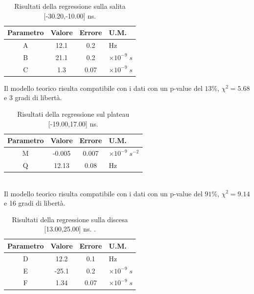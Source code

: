\documentclass[11pt]{article} %
\begin{document}
\begin{table}[!h]
\begin{center}
\begin{tabular}{|c|c|c|l|}
\hline
\multicolumn{1}{|l|}{Parametro} & \multicolumn{1}{l|}{Valore} & \multicolumn{1}{l|}{Errore} & U.M. \\ \hline
A                               & 12.1                       & 0.2                      & Hz     \\ \hline
B                               & 21.1                        & 0.2                           & $\times10^{-9}\;s$    \\ \hline
C                               & 1.3                          & 0.07                          &  $\times10^{-9}\;s$    \\ \hline
\end{tabular}
\end{center}
\caption{Risultati della regressione sulla salita [-30.20,-10.00] ns.}
\end{table}
Il modello teorico risulta compatibile con i dati con un p-value del $13\%$, $\chi ^2=5.68$ e 3 gradi di libertà.
\begin{table}[!h]
\begin{center}
\begin{tabular}{|c|c|c|l|}
\hline
\multicolumn{1}{|l|}{Parametro} & \multicolumn{1}{l|}{Valore} & \multicolumn{1}{l|}{Errore} & U.M. \\ \hline
M                               & -0.005                       & 0.007                 & $\times 10^{-9}\;s^{-2}$     \\ \hline
Q                               & 12.13                      & 0.08                           & Hz    \\ \hline
\end{tabular}
\end{center}
\caption{Risultati della regressione sul plateau  [-19.00,17.00] ns.}
\end{table}
\\Il modello teorico risulta compatibile con i dati con un p-value del $91\%$, $\chi ^2=9.14$ e 16 gradi di libertà.
\begin{table}[!h]
\begin{center}
\begin{tabular}{|c|c|c|l|}
\hline
\multicolumn{1}{|l|}{Parametro} & \multicolumn{1}{l|}{Valore} & \multicolumn{1}{l|}{Errore} & U.M. \\ \hline
D                               & 12.2                       & 0.1                       &    Hz \\ \hline
E                               & -25.1                       & 0.2                           & $\times10^{-9}\;s$    \\ \hline
F                               & 1.34                          & 0.07                           & $\times10^{-9}\;s$    \\ \hline
\end{tabular}
\end{center}
\caption{Risultati della regressione sulla discesa [13.00,25.00] ns. .}
\end{table}
\end{document}
